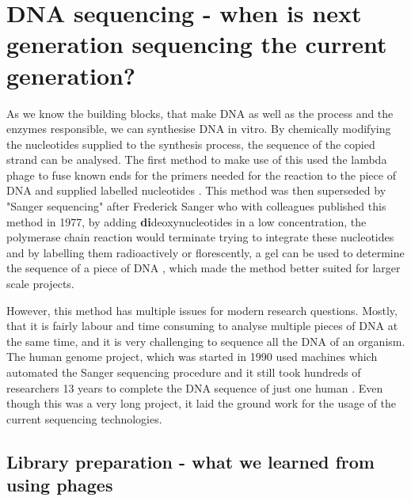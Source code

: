 \section[DNA sequencing]{DNA sequencing - when is next generation sequencing the current generation?}
\label{intro-sec:sequencing}

As we know the building blocks, that make DNA as well as the process and the enzymes responsible, we can synthesise DNA in vitro. By chemically modifying the nucleotides supplied to the synthesis process, the sequence of the copied strand can be analysed. The first method to make use of this used the lambda phage to fuse known ends for the primers needed for the reaction to the piece of DNA and supplied labelled nucleotides \cite{Padmanabhan1974}. This method was then superseded by "Sanger sequencing" after Frederick Sanger who with colleagues published this method in 1977, by adding \textbf{di}deoxynucleotides in a low concentration, the polymerase chain reaction would terminate trying to integrate these nucleotides and by labelling them radioactively or florescently, a gel can be used to determine the sequence of a piece of DNA \cite{Sanger1975,Sanger1977}, which made the method better suited for larger scale projects.

However, this method has multiple issues for modern research questions. Mostly, that it is fairly labour and time consuming to analyse multiple pieces of DNA at the same time, and it is very challenging to sequence all the DNA of an organism. The human genome project, which was started in 1990 used machines which automated the Sanger sequencing procedure and it still took hundreds of researchers 13 years to complete the DNA sequence of just one human \cite{Lander2001,Venter2001}. Even though this was a very long project, it laid the ground work for the usage of the current sequencing technologies.

\subsection[Library preparation]{Library preparation - what we learned from using phages}
\label{intro-sec:libraryprep}

